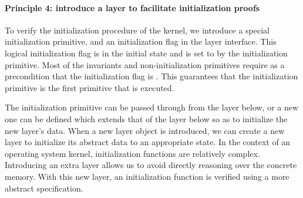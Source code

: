 \paragraph{Principle 4: introduce a layer to facilitate initialization proofs}
To verify the initialization procedure of the kernel,
we introduce 
a special initialization primitive,
and an  initialization flag in the layer interface.
This logical initialization flag 
is  in the initial state and is set to  by the initialization 
primitive. Most of the invariants and
non-initialization primitives require as a precondition that
the initialization flag is .
This guarantees that the initialization primitive is the first primitive that is executed. 

The initialization primitive can be
passed through from the layer below,
or a new one can be defined which extends that of the layer below
so as to initialize the new layer's data.
When a new layer object is introduced, 
we can create a new layer to initialize its abstract data to an appropriate state.
In the context of an operating system kernel, initialization functions are
relatively complex. Introducing an extra layer allows us to
avoid directly reasoning over the concrete memory. 
With this new layer, an initialization
function is verified using a more abstract specification.

